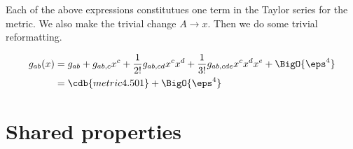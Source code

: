 \documentclass[12pt]{cdblatex}
\begin{document}
Each of the above expressions constitutues one term in the Taylor series for the metric.
We also make the trivial change $A\rightarrow x$. Then we do some trivial reformatting.

\begin{align*}
   g_{ab}(x) &=   g_{ab}
                + g_{ab,c} x^c
                + \frac{1}{2!} g_{ab,cd} x^c x^d
                + \frac{1}{3!} g_{ab,cde} x^c x^d x^e +  \BigO{\eps^4}\\
             &= \cdb{metric4.501} + \BigO{\eps^4}
\end{align*}

\clearpage

\section*{Shared properties}
\end{document}
